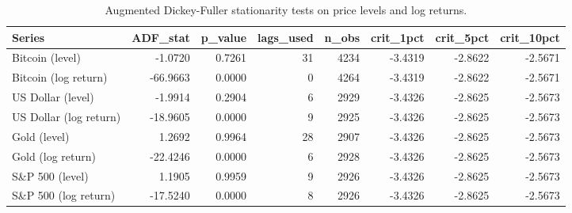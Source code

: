 \begin{table}
\caption{Augmented Dickey-Fuller stationarity tests on price levels and log returns.}
\label{tab:adf}
\begin{tabular}{lrrrrrrr}
\toprule
Series & ADF\_stat & p\_value & lags\_used & n\_obs & crit\_1pct & crit\_5pct & crit\_10pct \\
\midrule
Bitcoin (level) & -1.0720 & 0.7261 & 31 & 4234 & -3.4319 & -2.8622 & -2.5671 \\
Bitcoin (log return) & -66.9663 & 0.0000 & 0 & 4264 & -3.4319 & -2.8622 & -2.5671 \\
US Dollar (level) & -1.9914 & 0.2904 & 6 & 2929 & -3.4326 & -2.8625 & -2.5673 \\
US Dollar (log return) & -18.9605 & 0.0000 & 9 & 2925 & -3.4326 & -2.8625 & -2.5673 \\
Gold (level) & 1.2692 & 0.9964 & 28 & 2907 & -3.4326 & -2.8625 & -2.5673 \\
Gold (log return) & -22.4246 & 0.0000 & 6 & 2928 & -3.4326 & -2.8625 & -2.5673 \\
S\&P 500 (level) & 1.1905 & 0.9959 & 9 & 2926 & -3.4326 & -2.8625 & -2.5673 \\
S\&P 500 (log return) & -17.5240 & 0.0000 & 8 & 2926 & -3.4326 & -2.8625 & -2.5673 \\
\bottomrule
\end{tabular}
\end{table}
